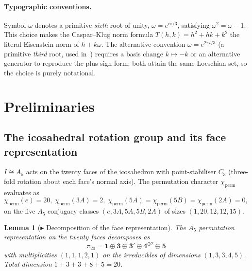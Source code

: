 \documentclass[12pt]{article}
\newtheorem{lemma}[theorem]{Lemma}
\begin{document}
\paragraph{Typographic conventions.} Symbol $\omega$ denotes a
primitive \emph{sixth} root of unity, $\omega = e^{i\pi/3}$, satisfying
$\omega^2 = \omega - 1$. This choice makes the Caspar--Klug norm
formula $T(h, k) = h^2 + hk + k^2$ the literal Eisenstein norm of
$h + k\omega$. The alternative convention $\omega = e^{2\pi i/3}$ (a
primitive \emph{third} root, used in~\cite[\S B3.1]{CascadeBio})
requires a basis change $k \mapsto -k$ or an alternative generator to
reproduce the plus-sign form; both attain the same Loeschian set, so
the choice is purely notational.

\section{Preliminaries}\label{sec:prelim}

\subsection{The icosahedral rotation group and its face representation}

$I \cong A_5$ acts on the twenty faces of the icosahedron with
point-stabiliser $C_3$ (three-fold rotation about each face's normal
axis). The permutation character $\chi_{\mathrm{perm}}$ evaluates as
\[
\chi_{\mathrm{perm}}(e) = 20,\;
\chi_{\mathrm{perm}}(3A) = 2,\;
\chi_{\mathrm{perm}}(5A) = \chi_{\mathrm{perm}}(5B) = \chi_{\mathrm{perm}}(2A) = 0,
\]
on the five $A_5$ conjugacy classes $(e, 3A, 5A, 5B, 2A)$ of sizes
$(1, 20, 12, 12, 15)$.

\begin{lemma}[$\blacktriangleright$ Decomposition of the face representation]\label{lem:L0}
The $A_5$ permutation representation on the twenty faces decomposes as
\[
\pi_{20} = \mathbf{1} \oplus \mathbf{3} \oplus \mathbf{3}' \oplus \mathbf{4}^{\oplus 2} \oplus \mathbf{5}
\]
with multiplicities $(1, 1, 1, 2, 1)$ on the irreducibles of dimensions
$(1, 3, 3, 4, 5)$. Total dimension $1 + 3 + 3 + 8 + 5 = 20$.
\end{lemma}
\end{document}
